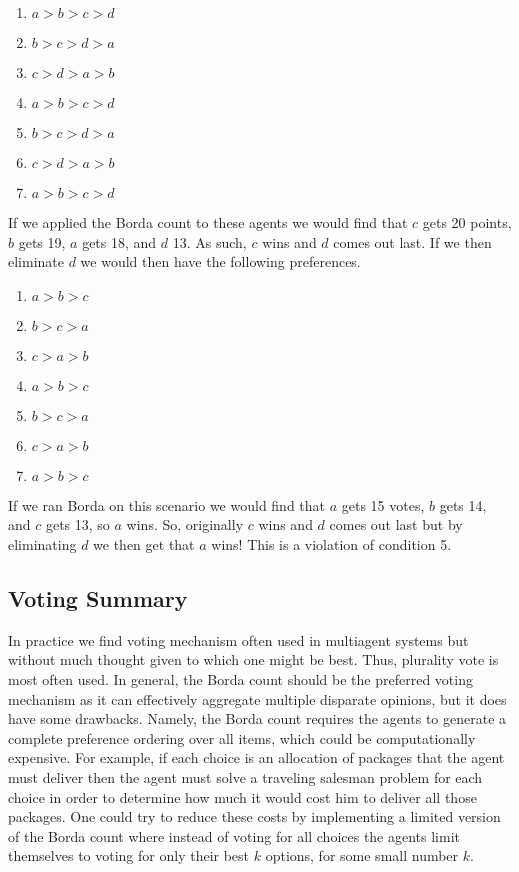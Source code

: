 \begin{enumerate}
\item $a > b > c > d$
\item $b > c > d > a$
\item $c > d > a > b$
\item $a > b > c > d$
\item $b > c > d > a$
\item $c > d > a > b$
\item $a > b > c > d$
\end{enumerate}

If we applied the Borda count to these agents we would find that $c$
gets 20 points, $b$ gets 19, $a$ gets 18, and $d$ 13. As such, $c$
wins and $d$ comes out last. If we then eliminate $d$ we would then
have the following preferences.

\begin{enumerate}
\item $a > b > c$
\item $b > c > a$
\item $c > a > b$
\item $a > b > c$
\item $b > c > a$
\item $c > a > b$
\item $a > b > c$
\end{enumerate}

If we ran Borda on this scenario we would find that $a$ gets 15 votes,
$b$ gets 14, and $c$ gets 13, so $a$ wins. So, originally $c$ wins and
$d$ comes out last but by eliminating $d$ we then get that $a$ wins!
This is a violation of condition 5.

\subsection{Voting Summary}

In practice we find voting mechanism often used in multiagent systems
but without much thought given to which one might be best. Thus,
plurality vote is most often used. In general, the Borda count should
be the preferred voting mechanism as it can effectively aggregate
multiple disparate opinions, but it does have some drawbacks.  Namely,
the Borda count requires the agents to generate a complete preference
ordering over all items, which could be computationally expensive. For
example, if each choice is an allocation of packages that the agent
must deliver then the agent must solve a traveling salesman problem
for each choice in order to determine how much it would cost him to
deliver all those packages. One could try to reduce these costs by
implementing a limited version of the Borda count where instead of
voting for all choices the agents limit themselves to voting for only
their best $k$ options, for some small number $k$.


